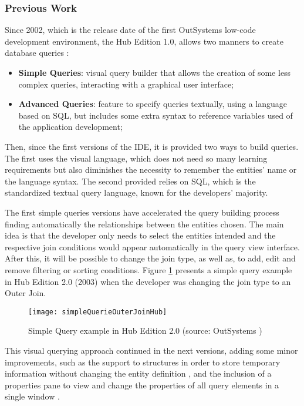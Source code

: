 \subsubsection{Previous Work}
\label{subsubsec:previous_work}

Since 2002, which is the release date of the first OutSystems low-code development environment, the Hub Edition 1.0, allows two manners to create database queries \cite{whatsNotNewInOutsystems}:

\begin{itemize}
	\item \textbf{Simple Queries}: visual query builder that allows the creation of some less complex queries, interacting with a graphical user interface;
	\item \textbf{Advanced Queries}: feature to specify queries textually, using a language based on \gls{SQL}, but includes some extra syntax to reference variables used of the application development;
\end{itemize}

Then, since the first versions of the \gls{IDE}, it is provided two ways to build queries. The first uses the visual language, which does not need so many learning requirements but also diminishes the necessity to remember the entities' name or the language syntax. The second provided relies on \gls{SQL}, which is the standardized textual query language, known for the developers' majority.

The first simple queries versions have accelerated the query building process finding automatically the relationships between the entities chosen. The main idea is that the developer only needs to select the entities intended and the respective join conditions would appear automatically in the query view interface. After this, it will be possible to change the join type, as well as, to add, edit and remove filtering or sorting conditions. Figure \ref{fig:ss_simpleQuerieOuterJoinHub2} presents a simple query example in Hub Edition 2.0 (2003) when the developer was changing the join type to an Outer Join.

\begin{figure}[tb]
	\centering
	\texttt{[image: simpleQuerieOuterJoinHub]}
	\caption{Simple Query example in Hub Edition 2.0 (source: OutSystems \cite{whatsNewHub2})}
	\label{fig:ss_simpleQuerieOuterJoinHub2}
\end{figure}

This visual querying approach continued in the next versions, adding some minor improvements, such as the support to structures in order to store temporary information without changing the entity definition \cite{whatsNewHub22}, and the inclusion of a properties pane to view and change the properties of all query elements in a single window \cite{agilePlatform5}.

